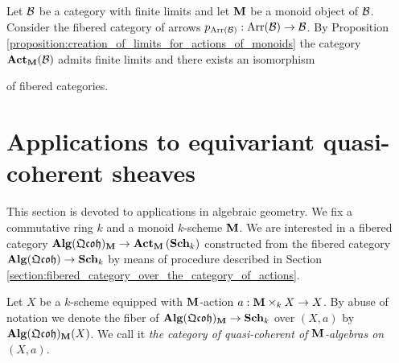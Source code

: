 \begin{example}\label{example:the_fibered_category_of_equivariant_objects_with_respect_to_a_monoid_in_category_of_arrows}
Let ${\mathcal B}$ be a category with finite limits and let $\mathbf{M}$ be a monoid object of ${\mathcal B}$. Consider the fibered category of arrows $p_{\mathrm{Arr}({\mathcal B})}:\mathrm{Arr}({\mathcal B})\rightarrow {\mathcal B}$. By Proposition \ref{proposition:creation_of_limits_for_actions_of_monoids} the category $\mathbf{Act}_{\mathbf{M}}({\mathcal B})$ admits finite limits and there exists an isomorphism
\begin{center}
\end{center}
of fibered categories.
\end{example}

\section{Applications to equivariant quasi-coherent sheaves}
\noindent
This section is devoted to applications in algebraic geometry. We fix a commutative ring $k$ and a monoid $k$-scheme $\mathbf{M}$. We are interested in a fibered category $\mathbf{Alg}(\mathfrak{Qcoh})_{\mathbf{M}}\rightarrow \mathbf{Act}_{\mathbf{M}}\left(\mathbf{Sch}_k\right)$ constructed from the fibered category $\mathbf{Alg}(\mathfrak{Qcoh})\rightarrow \mathbf{Sch}_k$ by means of procedure described in Section \ref{section:fibered_category_over_the_category_of_actions}. 

\begin{definition}
Let $X$ be a $k$-scheme equipped with $\mathbf{M}$-action $a:\mathbf{M}\times_kX\rightarrow X$. By abuse of notation we denote the fiber of $\mathbf{Alg}(\mathfrak{Qcoh})_{\mathbf{M}}\rightarrow \mathbf{Sch}_k$ over $(X,a)$ by $\mathbf{Alg}(\mathfrak{Qcoh})_{\mathbf{M}}(X)$. We call it \textit{the category of quasi-coherent of $\mathbf{M}$-algebras on $(X,a)$}.
\end{definition}

